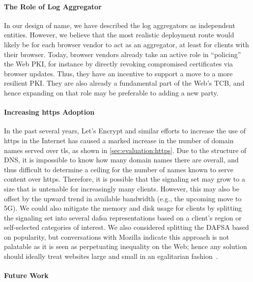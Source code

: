 \paragraph{The Role of Log Aggregator}

In our design of \ac{name}, we have described the log aggregators as independent entities.
However, we believe that the most realistic deployment route would likely be for
each browser vendor to act as an aggregator, at least for clients with their browser.
Today, browser vendors already take an active role in ``policing'' the Web PKI,
for instance by directly revoking compromised certificates via browser updates.
Thus, they have an incentive to support a move to a more resilient PKI.  
They are also already a fundamental part of the Web's TCB,
and hence expanding on that role may be preferable to adding a new party.

\paragraph{Increasing \ac{https} Adoption}

In the past several years, Let's Encrypt and similar efforts to increase
the use of \ac{https} in the Internet has caused a marked increase in the number
of domain names served over \ac{tls}, as shown in
\autoref{sec:evaluation:https}. Due to the structure of DNS, it is impossible to
know how many domain names there are overall, and thus difficult to determine a
ceiling for the number of names known to serve content over \ac{https}.
Therefore, it is possible that the signaling set may grow to a size that is
untenable for increasingly many clients.
However, this may also be offset by the upward trend in available bandwidth
(e.g., the upcoming move to 5G).
We could also mitigate the memory and disk usage for clients by splitting the 
signaling set into several \ac{dafsa} representations based 
on a client's region or self-selected categories of interest.
We also considered splitting the DAFSA based on popularity,
but conversations with Mozilla indicate this approach is not palatable
as it is seen as perpetuating inequality on the Web;
hence any solution should ideally treat websites large and small 
in an egalitarian fashion~\cite{privatecomm}.

\paragraph{Future Work}


